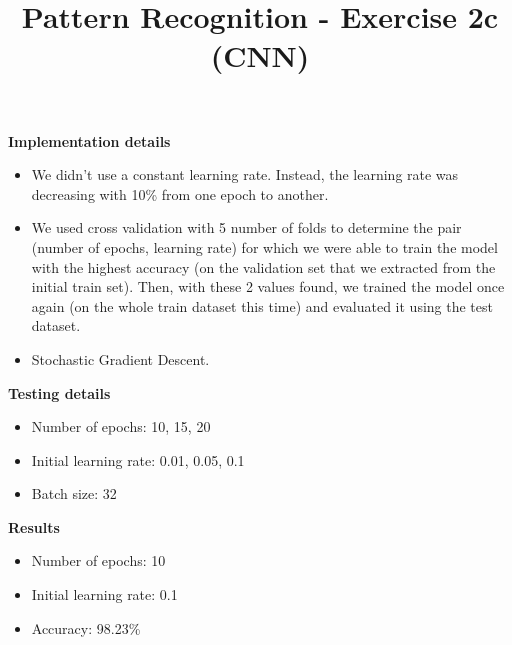 \documentclass[10pt,a4paper,fullpage]{article}
\begin{document}
\title{Pattern Recognition - Exercise 2c (CNN)}
\author{}
\predate{}
\postdate{}
\date{\vspace{-5ex}}
\maketitle


\textbf{Implementation details}
\begin{itemize}
	\item We didn't use a constant learning rate. Instead, the learning rate was decreasing with 10\% from one epoch to another.
	\item We used cross validation with 5 number of folds to determine the pair (number of epochs, learning rate) for which we were able to train the model with the highest accuracy (on the validation set that we extracted from the initial train set). Then, with these 2 values found, we trained the model once again (on the whole train dataset this time) and evaluated it using the test dataset.
	\item Stochastic Gradient Descent.
\end{itemize}


\textbf{Testing details}
\begin{itemize}
	\item Number of epochs: 10, 15, 20
	\item Initial learning rate: 0.01, 0.05, 0.1
	\item Batch size: 32
\end{itemize}


\textbf{Results}
\begin{itemize}
	\item Number of epochs: 10
	\item Initial learning rate: 0.1
	\item Accuracy: 98.23\%
\end{itemize}


\end{document}
